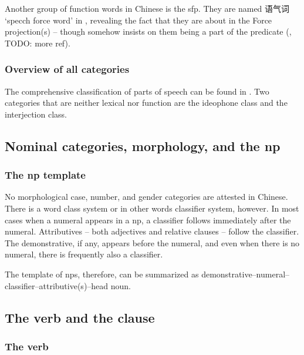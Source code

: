 \documentclass[UTF8, a4paper, oneside, scheme=plain]{ctexart}
\newcommand*{\citesec}[1]{\S~{#1}}
\newcommand{\translate}[1]{`#1'}
\begin{document}
Another group of function words in Chinese is the \ac{sfp}.
They are named 语气词 \translate{specch force word} in \citet{zhudexigrammar},
revealing the fact that they are about in the Force projection(s)
-- though \citet{zhudexigrammar} somehow insists on them being a part of the predicate
(, TODO: more ref).

\subsubsection{Overview of all categories}

The comprehensive classification of parts of speech can be found in \citet[\citesec{3.6}]{zhudexigrammar}.
Two categories that are neither lexical nor function 
are the ideophone class and the interjection class.

\subsection{Nominal categories, morphology, and the \ac{np}}

\subsubsection{The \ac{np} template}

No morphological case, number, and gender categories are attested in Chinese.
There is a word class system or in other words classifier system, however.
In most cases when a numeral appears in a \ac{np},
a classifier follows immediately after the numeral.
Attributives -- both adjectives and relative clauses -- 
follow the classifier. %
The demonstrative, if any, appears before the numeral,
and even when there is no numeral,
there is frequently also a classifier.

The template of \ac{np}s, therefore, can be summarized as 
demonstrative--numeral--classifier--attributive(s)--head noun.

\subsection{The verb and the clause}

\subsubsection{The verb}
\end{document}
